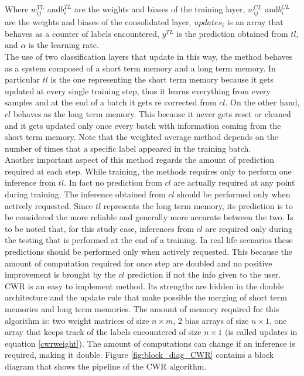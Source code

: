 \documentclass[12pt]{report}
\begin{document}
Where $w^{TL}_{ij}$ and$b^{TL}_i$  are the weights and biases of the training layer, $w^{CL}_{ij}$ and$b^{CL}_i$ are the weights and biases of the consolidated layer,  $updates_{i}$ is an array that behaves as a counter of labels encountered, $y^{TL}$ is the prediction obtained from $tl$, and $\alpha$ is the learning rate.\\
The use of two classification layers that update in this way, the method behaves as a system composed of a short term memory and a long term memory. In particular $tl$ is the one representing the short term memory because it gets updated at every single training step, thus it learns everything from every samples and at the end of a batch it gets re corrected from $cl$. On the other hand, $cl$ behaves as the long term memory. This because it never gets reset or cleaned and it gets updated only once every batch with information coming from the short term memory. Note that the weighted average method depends on the number of times that a specific label appeared in the training batch.\\
Another important aspect of this method regards the amount of prediction required at each step. While training, the methods requires only to perform one inference from $tl$. In fact no prediction from $cl$ are actually required at any point during training. The inference obtained from $cl$ should be performed only when actively requested. Since $tl$ represents the long term memory, its prediction is to be considered the more reliable and generally more accurate between the two. Is to be noted that, for this study case, inferences from $cl$ are required only during the testing that is performed at the end of a training. In real life scenarios these predictions should be performed only when actively requested. This because the amount of computation required for once step are doubled and no positive improvement is brought by the $cl$ prediction if not the info given to the user.\\
CWR is an easy to implement method. Its strengths are hidden in the double architecture and the update rule that make possible the merging of short term memories and long term memories. The amount of memory required for this algorithm is: two weight matrices of size $n \times m$, 2 bias arrays of size $n \times 1$, one array that keeps track of the labels encountered of size $n \times 1$ (is called updates in equation \ref{cwrweight}). The amount of computations can change if an inference is required, making it double. Figure \ref{fig:block_diag_CWR} contains a block diagram that shows the pipeline of the CWR algorithm.
\end{document}
